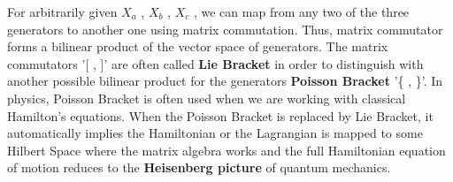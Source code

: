 For arbitrarily given $X_a$ , $X_b$ , $X_c$ , we can map from any two of the three generators to another one using matrix commutation. 
Thus, matrix commutator forms a bilinear product of the vector space of generators. 
The matrix commutators '[ , ]' are often called \textbf{Lie Bracket} in order to distinguish with another possible bilinear product for the generators \textbf{Poisson Bracket} '\{ , \}'.
In physics, Poisson Bracket is often used when we are working with classical Hamilton's equations. 
When the Poisson Bracket is replaced by Lie Bracket, it automatically implies the Hamiltonian or the Lagrangian is mapped to some Hilbert Space where the matrix
algebra works and the full Hamiltonian equation of motion reduces to the \textbf{Heisenberg picture} of quantum mechanics.

\newpage
